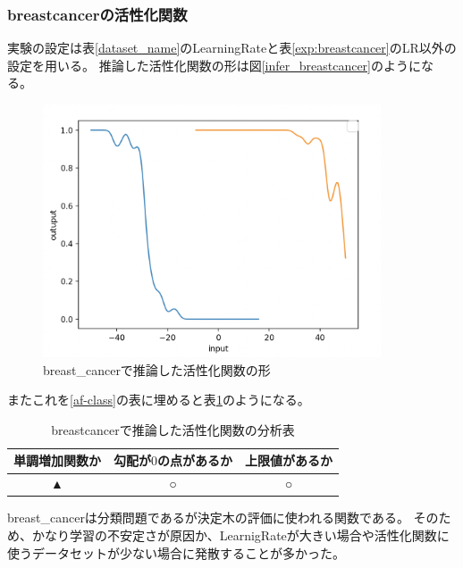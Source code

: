 \subsubsection{breastcancerの活性化関数}
実験の設定は表\ref{dataset_name}のLearningRateと表\ref{exp:breastcancer}のLR以外の設定を用いる。
推論した活性化関数の形は図\ref{infer_breastcancer}のようになる。
\begin{figure}[hbtp]
    \begin{center}
        \includegraphics[width=10cm]{asset/breastcancer-0.01.png}
            \caption{breast\_cancerで推論した活性化関数の形}
            \label{ifer_breastcancer}
    \end{center}
\end{figure}

またこれを\ref{af-class}の表に埋めると表\ref{anal_breastcancer}のようになる。
\begin{table}[htbp]
    \begin{center}
        \caption{breastcancerで推論した活性化関数の分析表}
        \label{anal_breastcancer}
        \vspace{2mm} 
        \begin{tabular}{ |c|c|c| }
        単調増加関数か & 勾配が$ 0 $の点があるか & 上限値があるか   \\
        \hline
        ▲ & ○ & ○   \\
        \end{tabular}
    \end{center}
\end{table}


breast\_cancerは分類問題であるが決定木の評価に使われる関数である。
そのため、かなり学習の不安定さが原因か、LearnigRateが大きい場合や活性化関数に使うデータセットが少ない場合に発散することが多かった。




